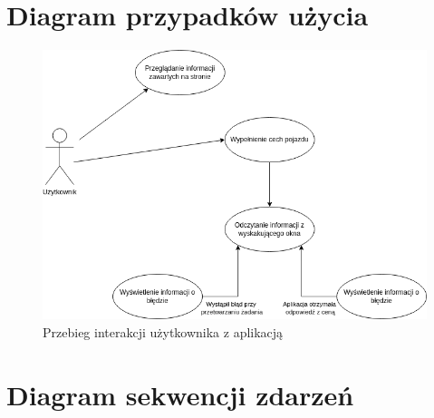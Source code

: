 \documentclass[12pt, a4paper]{report}
\begin{document}
\section{Diagram przypadków użycia}
\begin{figure}[H]
    \centering
    \includegraphics[width=1\textwidth]{diagrams/use_case_diagram.png}
    \caption{Przebieg interakcji użytkownika z aplikacją}
\end{figure}
\section{Diagram sekwencji zdarzeń}
\end{document}
